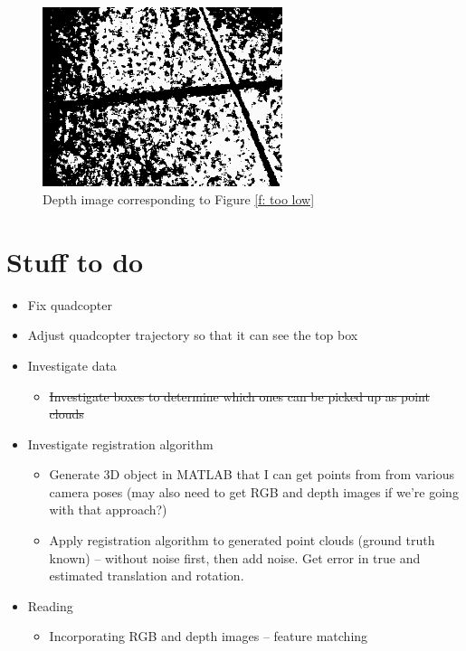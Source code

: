 \documentclass[12pt,a4paper]{article}
\begin{document}
\begin{figure}[h]
  \centering
    \includegraphics[width=70mm]{misc/16-6_too-low_depth.png}
  \caption{Depth image corresponding to Figure \ref{f: too low}}
  \label{f: too low depth}
\end{figure}


\section{Stuff to do}
\begin{itemize}
\item Fix quadcopter
\item Adjust quadcopter trajectory so that it can see the top box
\item Investigate data
\begin{itemize}
\item \sout{Investigate boxes to determine which ones can be picked up as point clouds}
\end{itemize}
\item Investigate registration algorithm
\begin{itemize}
\item Generate 3D object in MATLAB that I can get points from from various camera poses (may also need to get RGB and depth images if we're going with that approach?)
\item Apply registration algorithm to generated point clouds (ground truth known) -- without noise first, then add noise. Get error in true and estimated translation and rotation.
\end{itemize}
\item Reading
\begin{itemize}
\item Incorporating RGB and depth images -- feature matching
\end{itemize}
\end{itemize}
\end{document}
